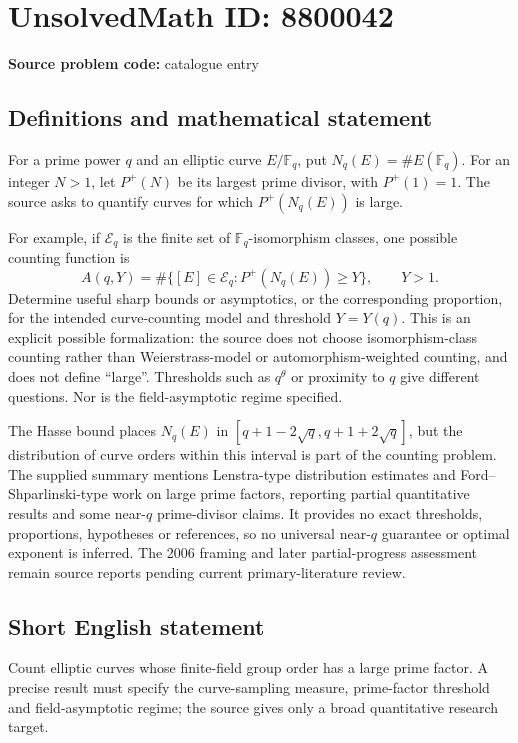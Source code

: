 \documentclass[11pt]{article}
\begin{document}
\section*{UnsolvedMath ID: 8800042}
\textbf{Source problem code:} catalogue entry
\subsection{Definitions and mathematical statement}
For a prime power \(q\) and an elliptic curve \(E/\mathbb F_q\), put \(N_q(E)=\#E(\mathbb F_q)\). For an integer \(N>1\), let \(P^+(N)\) be its largest prime divisor, with \(P^+(1)=1\). The source asks to quantify curves for which \(P^+(N_q(E))\) is large.

For example, if \(\mathcal E_q\) is the finite set of \(\mathbb F_q\)-isomorphism classes, one possible counting function is
\[
 A(q,Y)=\#\{[E]\in\mathcal E_q:P^+(N_q(E))\ge Y\},\qquad Y>1.
\]
Determine useful sharp bounds or asymptotics, or the corresponding proportion, for the intended curve-counting model and threshold \(Y=Y(q)\). This is an explicit possible formalization: the source does not choose isomorphism-class counting rather than Weierstrass-model or automorphism-weighted counting, and does not define ``large''. Thresholds such as \(q^\theta\) or proximity to \(q\) give different questions. Nor is the field-asymptotic regime specified.

The Hasse bound places \(N_q(E)\) in \([q+1-2\sqrt q,q+1+2\sqrt q]\), but the distribution of curve orders within this interval is part of the counting problem. The supplied summary mentions Lenstra-type distribution estimates and Ford--Shparlinski-type work on large prime factors, reporting partial quantitative results and some near-\(q\) prime-divisor claims. It provides no exact thresholds, proportions, hypotheses or references, so no universal near-\(q\) guarantee or optimal exponent is inferred. The 2006 framing and later partial-progress assessment remain source reports pending current primary-literature review.
\subsection{Short English statement}
Count elliptic curves whose finite-field group order has a large prime factor. A precise result must specify the curve-sampling measure, prime-factor threshold and field-asymptotic regime; the source gives only a broad quantitative research target.
\end{document}
